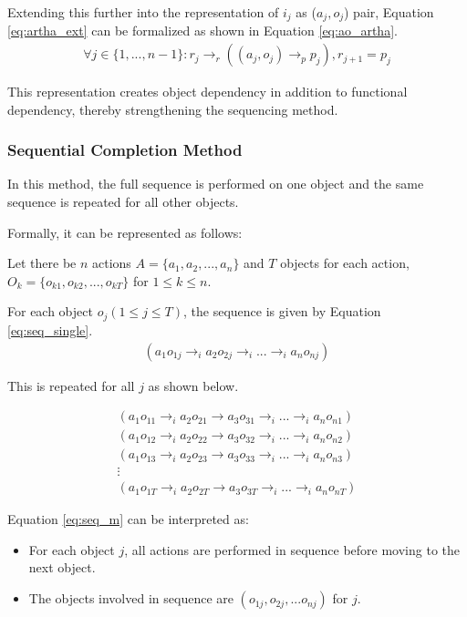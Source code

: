 \documentclass[a4paper,11pt]{lmcs}
\begin{document}
Extending this further into the representation  of $i_j$ as ($a_j,o_j$) pair, Equation \ref{eq:artha_ext} can be formalized as shown in Equation \ref{eq:ao_artha}.
\begin{eqnarray}
 \label{eq:ao_artha}
\forall j \in \{1,...,n-1\}: r_j \rightarrow_r ((a_j,o_j) \rightarrow_p p_j), r_{j+1} = p_j
\end{eqnarray}

This representation creates object dependency in addition to functional dependency, thereby strengthening the sequencing method.

\subsubsection{Sequential Completion Method}
In this method, the full sequence is performed on one object and the same sequence is repeated for all other objects.

Formally, it can be represented as follows:

Let there be $n$ actions $A = \{a_1,a_2,...,a_n\}$ and $T$ objects for each action, $O_k = \{o_{k1},o_{k2},...,o_{kT}\}$ for $1\leq k \leq n$.

For each object $o_j (1 \leq j \leq T)$, the sequence is given by Equation \ref{eq:seq_single}.
\begin{eqnarray}
 \label{eq:seq_single}
 (a_1o_{1j} \rightarrow_i a_2o_{2j} \rightarrow_i... \rightarrow_i a_no_{nj})
\end{eqnarray}

This is repeated for all $j$ as shown below.

\begin{eqnarray}
\label{eq:seq_m}
(a_{1} o_{11} \rightarrow_i a_2 o_{21} \rightarrow a_3 o_{31} \rightarrow_i ... \rightarrow_i a_n o_{n1}) \\
(a_{1} o_{12} \rightarrow_i a_2 o_{22} \rightarrow a_3 o_{32} \rightarrow_i ... \rightarrow_i a_n o_{n2}) \nonumber \\
(a_{1} o_{13} \rightarrow_i a_2 o_{23} \rightarrow a_3 o_{33} \rightarrow_i ... \rightarrow_i a_n o_{n3}) \nonumber \\
\vdots \nonumber \\
(a_{1} o_{1T} \rightarrow_i a_2 o_{2T} \rightarrow a_3 o_{3T} \rightarrow_i ... \rightarrow_i a_n o_{nT}) \nonumber
\end{eqnarray}

Equation \ref{eq:seq_m} can be interpreted as:
\begin{itemize}
 \item For each object $j$, all actions are performed in sequence before moving to the next object.
 \item The objects involved in sequence are $(o_{1j},o_{2j},...o_{nj})$ for $j$.
\end{itemize}
\end{document}
